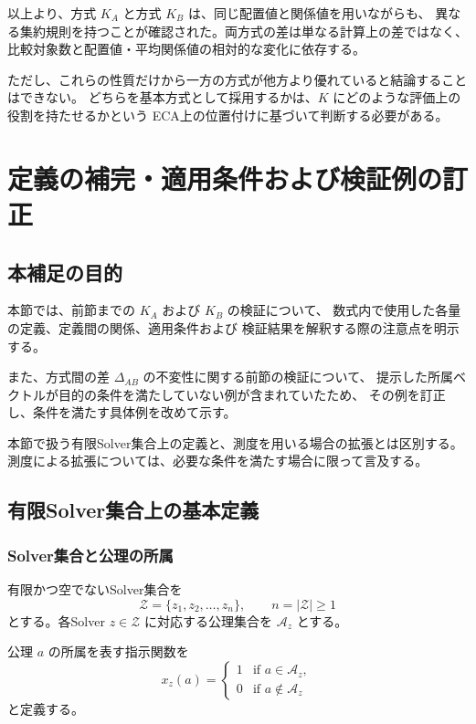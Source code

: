 \documentclass[a4paper,11pt]{ltjsarticle}
\begin{document}
以上より、方式 $K_A$ と方式 $K_B$ は、同じ配置値と関係値を用いながらも、
異なる集約規則を持つことが確認された。両方式の差は単なる計算上の差ではなく、
比較対象数と配置値・平均関係値の相対的な変化に依存する。

ただし、これらの性質だけから一方の方式が他方より優れていると結論することはできない。
どちらを基本方式として採用するかは、$K$ にどのような評価上の役割を持たせるかという
ECA上の位置付けに基づいて判断する必要がある。

\section{定義の補完・適用条件および検証例の訂正}
\label{sec:K-definitions-and-caveats}

\subsection{本補足の目的}

本節では、前節までの $K_A$ および $K_B$ の検証について、
数式内で使用した各量の定義、定義間の関係、適用条件および
検証結果を解釈する際の注意点を明示する。

また、方式間の差 $\Delta_{AB}$ の不変性に関する前節の検証について、
提示した所属ベクトルが目的の条件を満たしていない例が含まれていたため、
その例を訂正し、条件を満たす具体例を改めて示す。

本節で扱う有限Solver集合上の定義と、測度を用いる場合の拡張とは区別する。
測度による拡張については、必要な条件を満たす場合に限って言及する。

\subsection{有限Solver集合上の基本定義}

\subsubsection{Solver集合と公理の所属}

有限かつ空でないSolver集合を
\[
\mathcal{Z}=\{z_1,z_2,\ldots,z_n\},
\qquad n=|\mathcal{Z}|\geq 1
\]
とする。各Solver $z\in\mathcal{Z}$ に対応する公理集合を
$\mathcal{A}_z$ とする。

公理 $a$ の所属を表す指示関数を
\[
x_z(a)=
\begin{cases}
1 & \text{if }a\in\mathcal{A}_z,\\
0 & \text{if }a\notin\mathcal{A}_z
\end{cases}
\]
と定義する。
\end{document}
